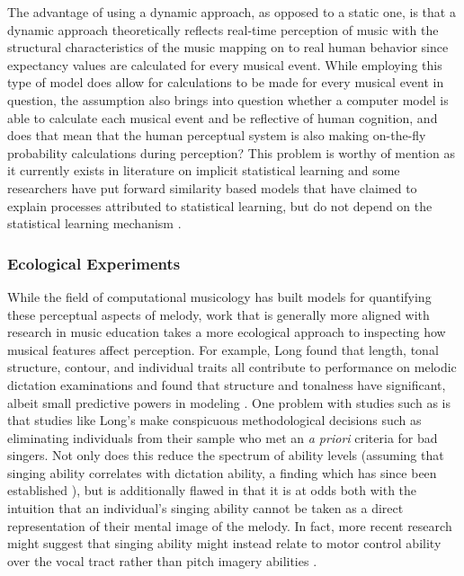 \documentclass[12pt,]{book}
\begin{document}
The advantage of using a dynamic approach, as opposed to a static one, is that a dynamic approach theoretically reflects real-time perception of music with the structural characteristics of the music mapping on to real human behavior since expectancy values are calculated for every musical event.
While employing this type of model does allow for calculations to be made for every musical event in question, the assumption also brings into question whether a computer model is able to calculate each musical event and be reflective of human cognition, and does that mean that the human perceptual system is also making on-the-fly probability calculations during perception?
This problem is worthy of mention as it currently exists in literature on implicit statistical learning \citep{perruchetImplicitLearningStatistical2006} and some researchers have put forward similarity based models that have claimed to explain processes attributed to statistical learning, but do not depend on the statistical learning mechanism \citep{jamiesonApplyingExemplarModel2009}.

\hypertarget{ecological-experiments}{%
\subsubsection{Ecological Experiments}\label{ecological-experiments}}

While the field of computational musicology has built models for quantifying these perceptual aspects of melody, work that is generally more aligned with research in music education takes a more ecological approach to inspecting how musical features affect perception.
For example, Long found that length, tonal structure, contour, and individual traits all contribute to performance on melodic dictation examinations and found that structure and tonalness have significant, albeit small predictive powers in modeling \citep{longRelationshipsPitchMemory1977}.
One problem with studies such as \citet{longRelationshipsPitchMemory1977} is that studies like Long's make conspicuous methodological decisions such as eliminating individuals from their sample who met an \emph{a priori} criteria for bad singers.
Not only does this reduce the spectrum of ability levels (assuming that singing ability correlates with dictation ability, a finding which has since been established \citep{norrisRelationshipSightSinging2003}), but is additionally flawed in that it is at odds both with the intuition that an individual's singing ability cannot be taken as a direct representation of their mental image of the melody.
In fact, more recent research might suggest that singing ability might instead relate to motor control ability over the vocal tract rather than pitch imagery abilities \citep{pfordresherPoorPitchSingingAbsence2007}.
\end{document}
